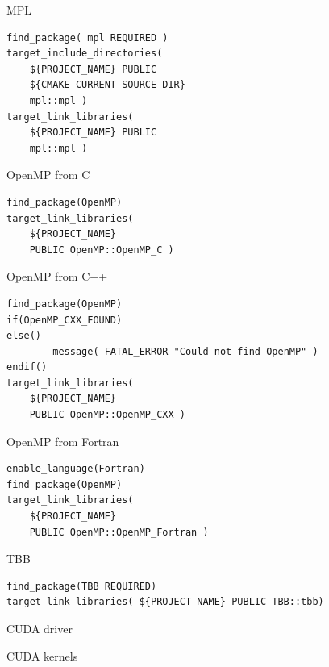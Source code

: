 \begin{numberedframe}{MPL}
\begin{lstlisting}
find_package( mpl REQUIRED )
target_include_directories(
	${PROJECT_NAME} PUBLIC
	${CMAKE_CURRENT_SOURCE_DIR}
	mpl::mpl )
target_link_libraries(
	${PROJECT_NAME} PUBLIC 
	mpl::mpl )
\end{lstlisting}
\end{numberedframe}

\begin{numberedframe}{OpenMP from C}
\begin{lstlisting}
find_package(OpenMP)
target_link_libraries(
    ${PROJECT_NAME}
    PUBLIC OpenMP::OpenMP_C )
\end{lstlisting}
\end{numberedframe}

\begin{numberedframe}{OpenMP from C++}
\begin{lstlisting}
find_package(OpenMP)
if(OpenMP_CXX_FOUND)
else()
        message( FATAL_ERROR "Could not find OpenMP" )
endif()
target_link_libraries(
    ${PROJECT_NAME}
    PUBLIC OpenMP::OpenMP_CXX )
\end{lstlisting}
\end{numberedframe}

\begin{numberedframe}{OpenMP from Fortran}
\begin{lstlisting}
enable_language(Fortran)
find_package(OpenMP)
target_link_libraries(
    ${PROJECT_NAME}
    PUBLIC OpenMP::OpenMP_Fortran )
\end{lstlisting}
\end{numberedframe}


\begin{numberedframe}{TBB}
\begin{lstlisting}
find_package(TBB REQUIRED)
target_link_libraries( ${PROJECT_NAME} PUBLIC TBB::tbb)
\end{lstlisting}
\end{numberedframe}

\begin{numberedframe}{CUDA driver}
  \lstset{numbers=left,numberstyle=\tiny}
  
\end{numberedframe}

\begin{numberedframe}{CUDA kernels}
  \lstset{numbers=left,numberstyle=\tiny}
  
\end{numberedframe}

